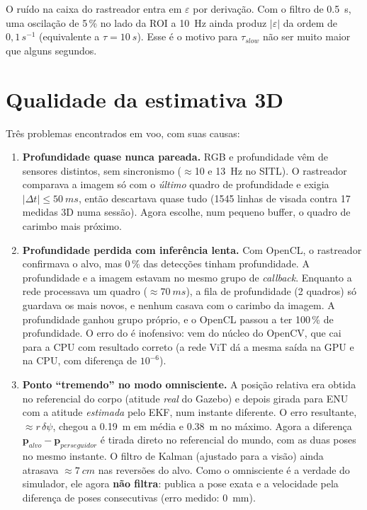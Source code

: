 \begin{atencao}
O ruído na caixa do rastreador entra em $\varepsilon$ por derivação. Com o filtro de
\SI{0,5}{s}, uma oscilação de 5\,\% no lado da ROI a \SI{10}{Hz} ainda produz
$|\varepsilon|$ da ordem de $0{,}1\,\si{s^{-1}}$ (equivalente a $\tau=\SI{10}{s}$). Esse é o
motivo para $\tau_{slow}$ não ser muito maior que alguns segundos.
\end{atencao}

\section{Qualidade da estimativa 3D}
Três problemas encontrados em voo, com suas causas:
\begin{enumerate}
  \item \textbf{Profundidade quase nunca pareada.} RGB e profundidade vêm de sensores
        distintos, sem sincronismo ($\approx$10 e \SI{13}{Hz} no SITL). O rastreador comparava
        a imagem só com o \emph{último} quadro de profundidade e exigia
        $|\Delta t|\le\SI{50}{ms}$, então descartava quase tudo (1545 linhas de visada contra
        17 medidas 3D numa sessão). Agora escolhe, num pequeno buffer, o quadro de carimbo
        mais próximo.
  \item \textbf{Profundidade perdida com inferência lenta.} Com OpenCL, o rastreador
        confirmava o alvo, mas 0\,\% das detecções tinham profundidade. A profundidade e a
        imagem estavam no mesmo grupo de \emph{callback}. Enquanto a rede processava um quadro
        ($\approx\SI{70}{ms}$), a fila de profundidade (2 quadros) só guardava os mais novos, e
        nenhum casava com o carimbo da imagem. A profundidade ganhou grupo próprio, e o OpenCL
        passou a ter 100\,\% de profundidade. O erro  do
         é inofensivo: vem do núcleo do OpenCV, que cai para a CPU com resultado
        correto (a rede ViT dá a mesma saída na GPU e na CPU, com diferença de $10^{-6}$).
  \item \textbf{Ponto ``tremendo'' no modo omnisciente.} A posição relativa era obtida no
        referencial do corpo (atitude \emph{real} do Gazebo) e depois girada para ENU com a
        atitude \emph{estimada} pelo EKF, num instante diferente. O erro resultante,
        $\approx r\,\delta\psi$, chegou a \SI{0,19}{m} em média e \SI{0,38}{m} no máximo. Agora a
        diferença $\mathbf p_{alvo}-\mathbf p_{perseguidor}$ é tirada direto no referencial
        do mundo, com as duas poses no mesmo instante. O filtro de Kalman (ajustado para a
        visão) ainda atrasava $\approx\SI{7}{cm}$ nas reversões do alvo. Como o omnisciente é a
        verdade do simulador, ele agora \textbf{não filtra}: publica a pose exata e a
        velocidade pela diferença de poses consecutivas (erro medido: \SI{0}{mm}).
\end{enumerate}
